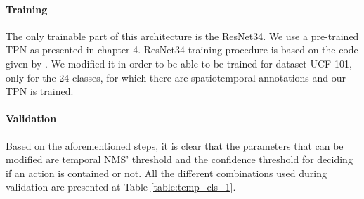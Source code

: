 \paragraph{Training} The only trainable part of this architecture is the ResNet34. We use a pre-trained TPN as presented in chapter 4.
ResNet34 training procedure is based on the code given by \cite{hara3dcnns}. We modified it in order to be able to be trained for dataset
UCF-101, only for the 24 classes, for which there are spatiotemporal annotations and our TPN is trained. 

\paragraph{Validation}
Based on the aforementioned steps, it is clear that the parameters that can be modified are temporal NMS' threshold and the confidence
threshold for deciding if an action is contained or not. All the different combinations used during validation are presented at Table
\ref{table:temp_cls_1}.
  
